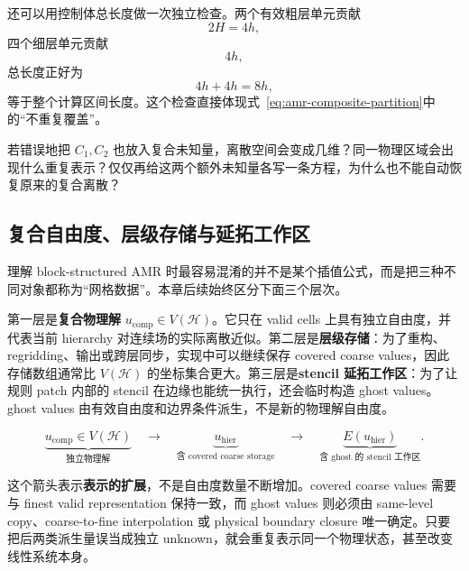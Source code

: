 还可以用控制体总长度做一次独立检查。两个有效粗层单元贡献
\begin{equation}
2H=4h,
\end{equation}
四个细层单元贡献
\begin{equation}
4h,
\end{equation}
总长度正好为
\begin{equation}
4h+4h=8h,
\end{equation}
等于整个计算区间长度。这个检查直接体现式~\eqref{eq:amr-composite-partition}中的“不重复覆盖”。

\begin{checkpointbox}
若错误地把 $C_1,C_2$ 也放入复合未知量，离散空间会变成几维？同一物理区域会出现什么重复表示？仅仅再给这两个额外未知量各写一条方程，为什么也不能自动恢复原来的复合离散？
\end{checkpointbox}

\subsection{复合自由度、层级存储与延拓工作区}

理解 block-structured AMR 时最容易混淆的并不是某个插值公式，而是把三种不同对象都称为“网格数据”。本章后续始终区分下面三个层次。

第一层是\textbf{复合物理解} $u_{\mathrm{comp}}\in V(\mathcal H)$。它只在 valid cells 上具有独立自由度，并代表当前 hierarchy 对连续场的实际离散近似。第二层是\textbf{层级存储}：为了重构、regridding、输出或跨层同步，实现中可以继续保存 covered coarse values，因此存储数组通常比 $V(\mathcal H)$ 的坐标集合更大。第三层是\textbf{stencil 延拓工作区}：为了让规则 patch 内部的 stencil 在边缘也能统一执行，还会临时构造 ghost values。ghost values 由有效自由度和边界条件派生，不是新的物理解自由度。

\begin{equation}
\boxed{
\underbrace{u_{\mathrm{comp}}\in V(\mathcal H)}_{\text{独立物理解}}
\quad\longrightarrow\quad
\underbrace{u_{\mathrm{hier}}}_{\text{含 covered coarse storage}}
\quad\longrightarrow\quad
\underbrace{E(u_{\mathrm{hier}})}_{\text{含 ghost 的 stencil 工作区}}.
}
\label{eq:amr-three-representations}
\end{equation}

这个箭头表示\textbf{表示的扩展}，不是自由度数量不断增加。covered coarse values 需要与 finest valid representation 保持一致，而 ghost values 则必须由 same-level copy、coarse-to-fine interpolation 或 physical boundary closure 唯一确定。只要把后两类派生量误当成独立 unknown，就会重复表示同一个物理状态，甚至改变线性系统本身。

